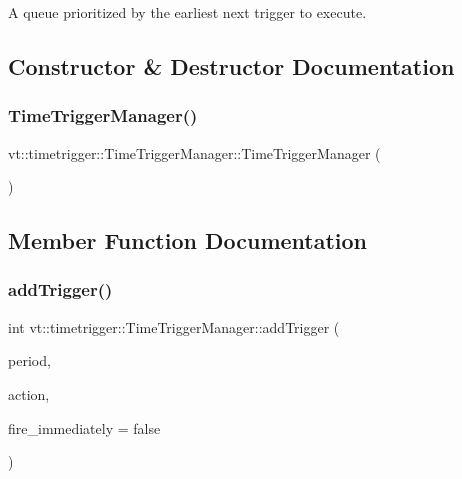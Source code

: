 A queue prioritized by the earliest next trigger to execute. 



\subsection{Constructor \& Destructor Documentation}
\mbox{\label{structvt_1_1timetrigger_1_1_time_trigger_manager_a5739a97e0a8c7a19943d030a04e63a35}} 
\subsubsection{\texorpdfstring{Time\+Trigger\+Manager()}{TimeTriggerManager()}}
{\footnotesize\ttfamily vt\+::timetrigger\+::\+Time\+Trigger\+Manager\+::\+Time\+Trigger\+Manager (\begin{DoxyParamCaption}{ }\end{DoxyParamCaption})\hspace{0.3cm}{\ttfamily [default]}}



\subsection{Member Function Documentation}
\mbox{\label{structvt_1_1timetrigger_1_1_time_trigger_manager_ac45c3677529eb6311e1823ac92829a7c}} 
\subsubsection{\texorpdfstring{add\+Trigger()}{addTrigger()}}
{\footnotesize\ttfamily int vt\+::timetrigger\+::\+Time\+Trigger\+Manager\+::add\+Trigger (\begin{DoxyParamCaption}\item[{std\+::chrono\+::milliseconds}]{period,  }\item[{\hyperlink{namespacevt_ae0a5a7b18cc99d7b732cb4d44f46b0f3}{Action\+Type}}]{action,  }\item[{bool}]{fire\+\_\+immediately = {\ttfamily false} }\end{DoxyParamCaption})}



